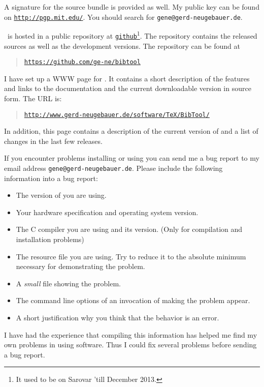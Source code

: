 \documentclass[11pt,a4paper]{scrbook}
\makeatletter
\newcommand\Link[2]{\href{#1}{\texttt{#2}}}
\let\BIBTEX\BibTeX
\renewcommand\BibTeX{\BIBTEX\index{bibtex@\BIBTEX}}
\makeatother
\begin{document}
A signature for the source bundle is provided as well. My public key can be
found  on \Link{http://pgp.mit.edu/}{http://pgp.mit.edu/}. You should search
for \texttt{gene@gerd-neugebauer.de}.

\BibTool\ is hosted in a public repository at
\Link{https://github.com}{github}\footnote{It used to be on
  Sarovar 'till December 2013.}. The repository contains the released sources
as well as the development versions. The repository can be found at
\begin{quote}
  \Link{https://github.com/ge-ne/bibtool}{https://github.com/ge-ne/bibtool}
\end{quote}

I have set up a WWW page for \BibTool. It contains a short description of the
features and links to the documentation and the current downloadable version
in source form. The URL is:

\begin{quote}
  \Link{http://www.gerd-neugebauer.de/software/TeX/BibTool/}{http://www.gerd-neugebauer.de/software/TeX/BibTool/}
\end{quote}

In addition, this page contains a description of the current version of
\BibTool{} and a list of changes in the last few releases.

If you encounter problems installing or using \BibTool{} you can send me a bug
report to my email address \texttt{gene@gerd-neugebauer.de}. Please include
the following information into a bug report:
\begin{itemize}
\item The version of \BibTool{} you are using.
\item Your hardware specification and operating system version.
\item The C compiler you are using and its version. (Only for compilation and
  installation problems)
\item The resource file you are using. Try to reduce it to the absolute
  minimum necessary for demonstrating the problem.
\item A \emph{small} \BibTeX{} file showing the problem.
\item The command line options of an invocation of \BibTool{} making
  the problem appear.
\item A short justification why you think that the behavior is an error.
\end{itemize}

I have had the experience that compiling this information has helped me find
my own problems in using software. Thus I could fix several problems before
sending a bug report.
\end{document}
